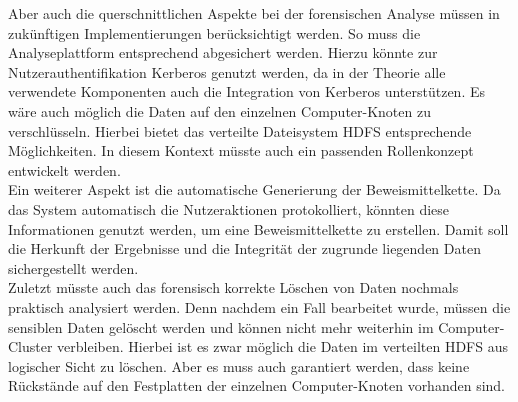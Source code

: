 \noindent
Aber auch die querschnittlichen Aspekte bei der forensischen Analyse müssen in zukünftigen Implementierungen berücksichtigt werden. So muss die Analyseplattform entsprechend abgesichert werden. Hierzu könnte zur Nutzerauthentifikation Kerberos genutzt werden, da in der Theorie alle verwendete Komponenten auch die Integration von Kerberos unterstützen. Es wäre auch möglich die Daten auf den einzelnen Computer-Knoten zu verschlüsseln. Hierbei bietet das verteilte Dateisystem HDFS entsprechende Möglichkeiten. In diesem Kontext müsste auch ein passenden Rollenkonzept entwickelt werden.\\
Ein weiterer Aspekt ist die automatische Generierung der Beweismittelkette. Da das System automatisch die Nutzeraktionen protokolliert, könnten diese Informationen genutzt werden, um eine Beweismittelkette zu erstellen. Damit soll die Herkunft der Ergebnisse und die Integrität der zugrunde liegenden Daten sichergestellt werden.\\
Zuletzt müsste auch das forensisch korrekte Löschen von Daten nochmals praktisch analysiert werden. Denn nachdem ein Fall bearbeitet wurde, müssen die sensiblen Daten gelöscht werden und können nicht mehr weiterhin im Computer-Cluster verbleiben. Hierbei ist es zwar möglich die Daten im verteilten HDFS aus logischer Sicht zu löschen. Aber es muss auch garantiert werden, dass keine Rückstände auf den Festplatten der einzelnen  Computer-Knoten vorhanden sind.